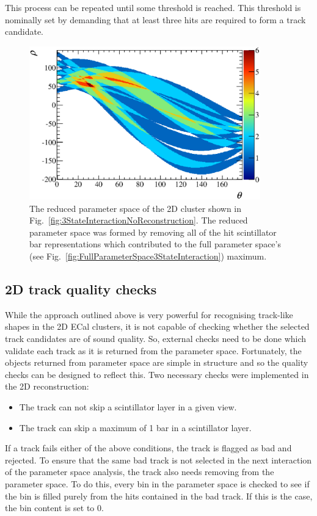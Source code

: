\newline
\newline
This process can be repeated until some threshold is reached.  This threshold is nominally set by demanding that at least three hits are required to form a track candidate.
\begin{figure}
  \centering
  \includegraphics[width=10cm]{images/ecal_hough_transform/ReducedParameterSpace_3StateInteraction.eps}
  \caption{The reduced parameter space of the 2D cluster shown in Fig.~\ref{fig:3StateInteractionNoReconstruction}.  The reduced parameter space was formed by removing all of the hit scintillator bar representations which contributed to the full parameter space's (see Fig.~\ref{fig:FullParameterSpace3StateInteraction}) maximum.}
  \label{fig:ReducedParameterSpace3StateInteraction}
\end{figure}

\subsection{2D track quality checks}
\label{subsec:2DTrackQualityChecks}
While the approach outlined above is very powerful for recognising track-like shapes in the 2D ECal clusters, it is not capable of checking whether the selected track candidates are of sound quality.  So, external checks need to be done which validate each track as it is returned from the parameter space.  Fortunately, the objects returned from parameter space are simple in structure and so the quality checks can be designed to reflect this.  Two necessary checks were implemented in the 2D reconstruction:
\begin{itemize}
\item The track can not skip a scintillator layer in a given view.
\item The track can skip a maximum of 1 bar in a scintillator layer.
\end{itemize}
If a track fails either of the above conditions, the track is flagged as bad and rejected.  To ensure that the same bad track is not selected in the next interaction of the parameter space analysis, the track also needs removing from the parameter space.  To do this, every bin in the parameter space is checked to see if the bin is filled purely from the hits contained in the bad track.  If this is the case, the bin content is set to 0.  


